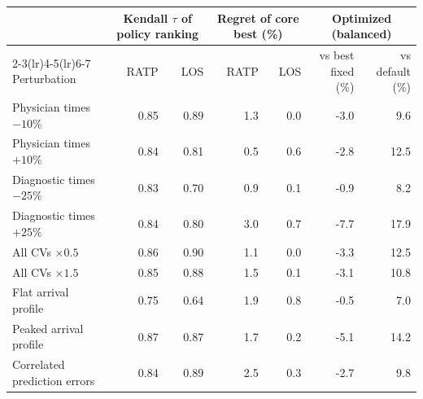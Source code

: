 \begin{tabular}{lrrrrrr}
\toprule
 & \multicolumn{2}{c}{Kendall $\tau$ of policy ranking} & \multicolumn{2}{c}{Regret of core best (\%)} & \multicolumn{2}{c}{Optimized (balanced)} \\
\cmidrule(lr){2-3}\cmidrule(lr){4-5}\cmidrule(lr){6-7}
Perturbation & RATP & LOS & RATP & LOS & vs best fixed (\%) & vs default (\%) \\
\midrule
Physician times $-10\%$ & 0.85 & 0.89 & 1.3 & 0.0 & -3.0 & 9.6 \\
Physician times $+10\%$ & 0.84 & 0.81 & 0.5 & 0.6 & -2.8 & 12.5 \\
Diagnostic times $-25\%$ & 0.83 & 0.70 & 0.9 & 0.1 & -0.9 & 8.2 \\
Diagnostic times $+25\%$ & 0.84 & 0.80 & 3.0 & 0.7 & -7.7 & 17.9 \\
All CVs $\times0.5$ & 0.86 & 0.90 & 1.1 & 0.0 & -3.3 & 12.5 \\
All CVs $\times1.5$ & 0.85 & 0.88 & 1.5 & 0.1 & -3.1 & 10.8 \\
Flat arrival profile & 0.75 & 0.64 & 1.9 & 0.8 & -0.5 & 7.0 \\
Peaked arrival profile & 0.87 & 0.87 & 1.7 & 0.2 & -5.1 & 14.2 \\
Correlated prediction errors & 0.84 & 0.89 & 2.5 & 0.3 & -2.7 & 9.8 \\
\bottomrule
\end{tabular}